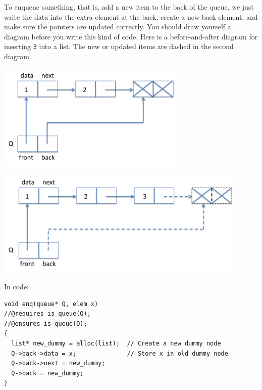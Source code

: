 To enqueue something, that is, add a new item to the back of
the queue, we just write the data into the
extra element at the back, create a new back element, and
make sure the pointers are updated correctly.  You should draw
yourself a diagram before you write this kind of code.
Here is a before-and-after diagram for inserting \lstinline'3'
into a list.  The new or updated items are dashed in the second
diagram.
\begin{center}
\includegraphics[width=0.67\textwidth]{img/queue2.png}\hspace*{8em}
\end{center}
\begin{center}
\includegraphics[width=0.9\textwidth]{img/queue3.png}
\end{center}
In code:
\begin{lstlisting}[language={[C0]C}]
void enq(queue* Q, elem x)
//@requires is_queue(Q);
//@ensures is_queue(Q);
{
  list* new_dummy = alloc(list);  // Create a new dummy node
  Q->back->data = x;              // Store x in old dummy node
  Q->back->next = new_dummy;
  Q->back = new_dummy;
}
\end{lstlisting}

